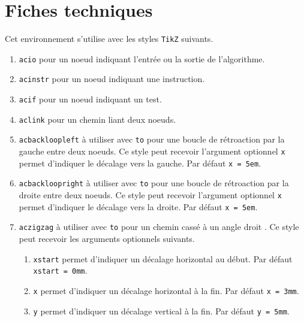 \documentclass[12pt,a4paper]{article}
\begin{document}


\section{Fiches techniques}


Cet environnement s'utilise avec les styles \verb#TikZ# suivants.

\begin{enumerate}
	\item \verb#acio# pour un noeud indiquant l'entrée ou la sortie de l'algorithme.

	\item \verb#acinstr# pour un noeud indiquant une instruction.

	\item \verb#acif# pour un noeud indiquant un test.

	\smallskip

	\item \verb#aclink# pour un chemin liant deux noeuds.

	\smallskip

	\item \verb#acbackloopleft# à utiliser avec \verb#to# pour une boucle de rétroaction par la gauche entre deux noeuds.
	      Ce style peut recevoir l'argument optionnel \verb#x# permet d'indiquer le décalage vers la gauche.
		  Par défaut \verb#x = 5em#.

	\item \verb#acbackloopright# à utiliser avec \verb#to# pour une boucle de rétroaction par la droite entre deux noeuds.
	      Ce style peut recevoir l'argument optionnel \verb#x# permet d'indiquer le décalage vers la droite.
		  Par défaut \verb#x = 5em#.

	\smallskip

	\item \verb#aczigzag# à utiliser avec \verb#to# pour un chemin \fg cassé à un angle droit \fg.
	      Ce style peut recevoir les arguments optionnels suivants.
	      \begin{enumerate}
	      		\item \verb#xstart# permet d'indiquer un décalage horizontal au début.
			          Par défaut \verb#xstart = 0mm#.

	      		\item \verb#x# permet d'indiquer un décalage horizontal à la fin.
			          Par défaut \verb#x = 3mm#.

	      		\item \verb#y# permet d'indiquer un décalage vertical à la fin.
			          Par défaut \verb#y = 5mm#.
	      \end{enumerate}
\end{enumerate}
\end{document}
